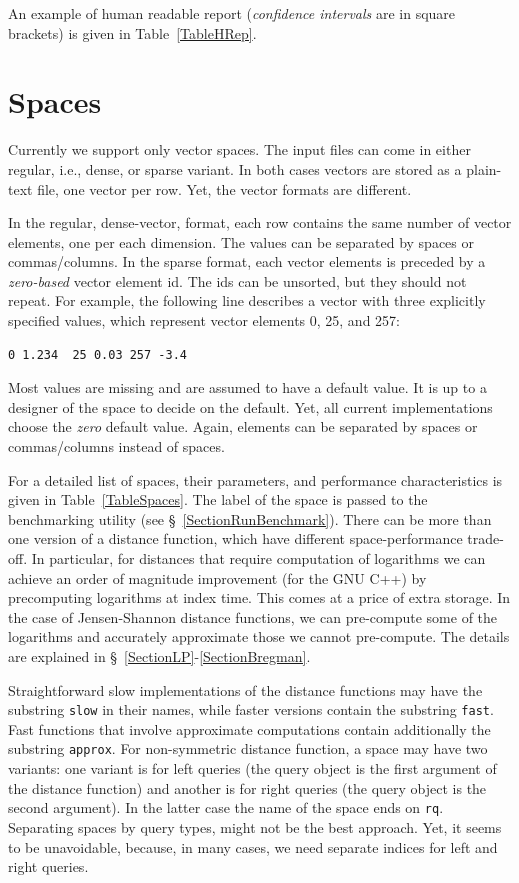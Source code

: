 \documentclass[runningheads,a4paper]{llncs}
\newcommand{\ttt}[1]{\texttt{#1}}
\begin{document}
{An example of human readable report (\emph{confidence intervals} are in square brackets)
is given in Table~\ref{TableHRep}.

\section{Spaces}\label{SectionSpaces}
Currently we support only vector spaces.
The input files can come in either regular, i.e., dense,
or sparse variant. 
In both cases vectors are stored
as a plain-text file, one vector per row.
Yet, the vector formats are different.

In the regular, dense-vector, format, each row
contains the same number of vector elements, one per each dimension.
The values can be separated by spaces or commas/columns.
In the sparse format, each vector elements is preceded
by a \emph{zero-based} vector element id. 
The ids can be unsorted, but they should not repeat.
For example, the following line
describes a vector with three explicitly specified values,
which represent vector elements 0, 25, and 257:
\begin{verbatim}
0 1.234  25 0.03 257 -3.4 
\end{verbatim}

Most values are missing and are assumed to have a default value.
It is up to a designer of the space to decide on the default.
Yet, all current implementations choose the \emph{zero} default value.
Again, elements can be separated by spaces or commas/columns instead of spaces.

For a detailed list of spaces, their parameters, 
and performance characteristics is given in Table~\ref{TableSpaces}.
The label of the space is passed to the benchmarking utility (see \S~\ref{SectionRunBenchmark}).
There can be more than one version of a distance function,
which have different space-performance trade-off.
In particular, for distances that require computation of logarithms 
we can achieve an order of magnitude improvement (for the GNU C++) by precomputing
logarithms at index time. This comes at a price of extra storage. 
In the case of Jensen-Shannon distance functions, we can pre-compute some 
of the logarithms and accurately approximate those we cannot pre-compute.
The details are explained in \S~\ref{SectionLP}-\ref{SectionBregman}.

Straightforward slow implementations of the distance functions may have the substring \ttt{slow}
in their names, while faster versions contain the substring \ttt{fast}.
Fast functions that involve approximate computations contain additionally the substring \ttt{approx}.
For non-symmetric distance function, a space may have two variants: one variant is for left
queries (the query object is the first argument of the distance function) 
and another is for right queries (the query object is the second argument).
In the latter case the name of the space ends on \texttt{rq}.
Separating spaces by query types, might not be the best approach.
Yet, it seems to be unavoidable, because, in many cases,
we need separate indices for left and right queries.

}
\end{document}
